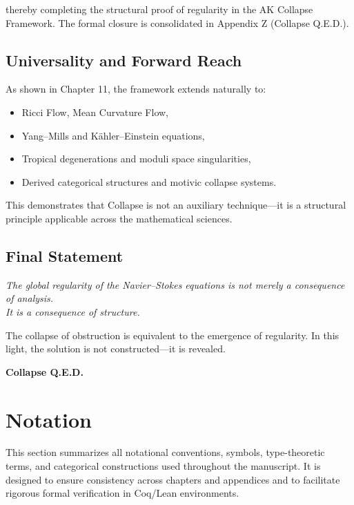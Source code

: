\documentclass[11pt]{article}
\begin{document}
thereby completing the structural proof of regularity in the AK Collapse Framework. The formal closure is consolidated in Appendix Z (Collapse Q.E.D.).

\subsection{Universality and Forward Reach}

As shown in Chapter 11, the framework extends naturally to:

\begin{itemize}
  \item Ricci Flow, Mean Curvature Flow,
  \item Yang–Mills and Kähler–Einstein equations,
  \item Tropical degenerations and moduli space singularities,
  \item Derived categorical structures and motivic collapse systems.
\end{itemize}

This demonstrates that Collapse is not an auxiliary technique—it is a structural principle applicable across the mathematical sciences.

\subsection{Final Statement}

\begin{center}
\textit{The global regularity of the Navier–Stokes equations is not merely a consequence of analysis.\\[0.3em]
It is a consequence of structure.}
\end{center}

The collapse of obstruction is equivalent to the emergence of regularity. In this light, the solution is not constructed—it is revealed.

\begin{center}
\textbf{Collapse Q.E.D.}
\end{center}



\section*{Notation}

This section summarizes all notational conventions, symbols, type-theoretic terms, and categorical constructions used throughout the manuscript. It is designed to ensure consistency across chapters and appendices and to facilitate rigorous formal verification in Coq/Lean environments.
\end{document}
